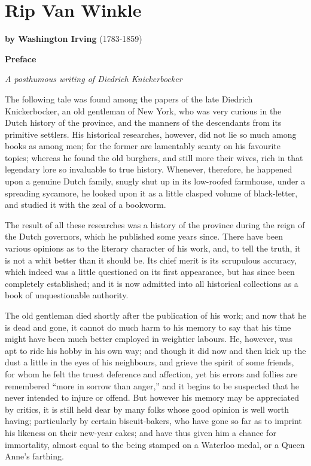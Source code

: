 \chapter{Rip Van Winkle}
\textbf{by Washington Irving} (1783-1859)\\
\begin{center}
	\textbf{Preface}\\
\end{center}

\begin{flushleft}
	\noindent\large\textit{A posthumous writing of Diedrich Knickerbocker}\\
\end{flushleft}

\noindent
The following tale was found among the papers of the late Diedrich Knickerbocker, an old gentleman of New York, who was very curious in the Dutch history of the province, and the manners of the descendants from its primitive settlers. His historical researches, however, did not lie so much among books as among men; for the former are lamentably scanty on his favourite topics; whereas he found the old burghers, and still more their wives, rich in that legendary lore so invaluable to true history. Whenever, therefore, he happened upon a genuine Dutch family, snugly shut up in its low-roofed farmhouse, under a spreading sycamore, he looked upon it as a little clasped volume of black-letter, and studied it with the zeal of a bookworm.

The result of all these researches was a history of the province during the reign of the Dutch governors, which he published some years since. There have been various opinions as to the literary character of his work, and, to tell the truth, it is not a whit better than it should be. Its chief merit is its scrupulous accuracy, which indeed was a little questioned on its first appearance, but has since been completely established; and it is now admitted into all historical collections as a book of unquestionable authority.

The old gentleman died shortly after the publication of his work; and now that he is dead and gone, it cannot do much harm to his memory to say that his time might have been much better employed in weightier labours. He, however, was apt to ride his hobby in his own way; and though it did now and then kick up the dust a little in the eyes of his neighbours, and grieve the spirit of some friends, for whom he felt the truest deference and affection, yet his errors and follies are remembered “more in sorrow than anger,” and it begins to be suspected that he never intended to injure or offend. But however his memory may be appreciated by critics, it is still held dear by many folks whose good opinion is well worth having; particularly by certain biscuit-bakers, who have gone so far as to imprint his likeness on their new-year cakes; and have thus given him a chance for immortality, almost equal to the being stamped on a Waterloo medal, or a Queen Anne’s farthing.

